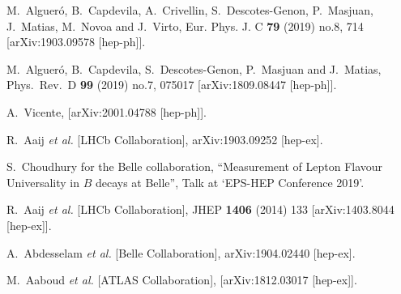 \documentclass[11pt,amsmath,amssymb]{article}
\begin{document}
  
\begin{thebibliography}{99}

M.~Alguer\'o, B.~Capdevila, A.~Crivellin, S.~Descotes-Genon, P.~Masjuan, J.~Matias, M.~Novoa and J.~Virto,
Eur. Phys. J. C \textbf{79} (2019) no.8, 714
[arXiv:1903.09578 [hep-ph]].

  M.~Alguer\'o, B.~Capdevila, S.~Descotes-Genon, P.~Masjuan and J.~Matias,
  Phys.\ Rev.\ D {\bf 99} (2019) no.7,  075017
  [arXiv:1809.08447 [hep-ph]].
  
A.~Vicente,
[arXiv:2001.04788 [hep-ph]].

  R.~Aaij {\it et al.} [LHCb Collaboration],
  arXiv:1903.09252 [hep-ex].
  
  S.~Choudhury for the Belle collaboration, ``Measurement of Lepton Flavour Universality in $B$ decays at Belle'', Talk at `EPS-HEP Conference 2019'.

  R.~Aaij {\it et al.} [LHCb Collaboration],
  JHEP {\bf 1406} (2014) 133
  [arXiv:1403.8044 [hep-ex]].


  A.~Abdesselam {\it et al.} [Belle Collaboration],
  arXiv:1904.02440 [hep-ex].

  M.~Aaboud {\it et al.} [ATLAS Collaboration],
  [arXiv:1812.03017 [hep-ex]].


\end{thebibliography}
\end{document}
